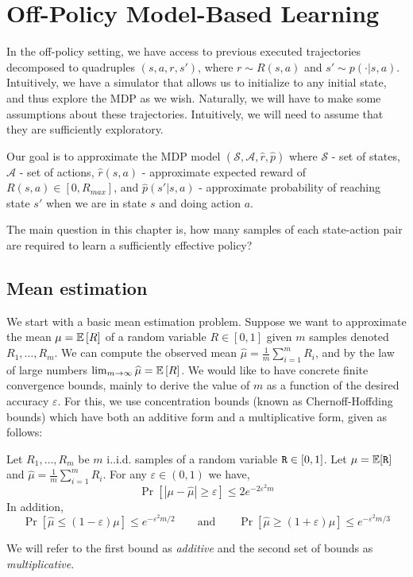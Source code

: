 \section{Off-Policy Model-Based Learning}
In the off-policy setting, we have access to previous executed trajectories decomposed to
quadruples $\left(s,a,r,s'\right)$, where $r\sim R\left(s,a\right)$
and $s'\sim p\left(\cdot|s,a\right)$. Intuitively, we have a simulator that allows us to initialize to any
initial state, and thus explore the MDP as we wish. Naturally, we will have to make some assumptions about these trajectories.
Intuitively, we will need to assume that they are sufficiently
exploratory.

Our goal is to approximate the MDP model $\left(\mathcal{S},\mathcal{A},\hat{r},\hat{p}\right)$
where $\mathcal{S}$ - set of states, $\mathcal{A}$ - set of actions,
$\hat{r}\left(s,a\right)$ - approximate expected reward of $R\left(s,a\right)\in\left[0,R_{max}\right]$,
and $\hat{p}\left(s'|s,a\right)$ - approximate probability of reaching
state $s'$ when we are in state $s$ and doing action $a$.

The main question in this chapter is, how many samples of each state-action pair are
required to learn a sufficiently effective policy?


\subsection{Mean estimation}

We start with a basic mean estimation problem. 
Suppose we want to approximate the mean $\mu=\mathbb{E}\left[R\right]$
of a random variable $R\in\left[0,1\right]$ given $m$ samples denoted
$R_{1},\dots,R_{m}$. We can compute the observed mean $\widehat{\mu}=\frac{1}{m}\sum_{i=1}^{m}R_{i}$,
and by the law of large numbers $\lim_{m\to\infty}\widehat{\mu}=\mathbb{E}\left[R\right]$.
We would like to have concrete finite convergence bounds, mainly to
derive the value of $m$ as a function of the desired accuracy $\varepsilon$.
For this, we use concentration bounds (known as Chernoff-Hoffding bounds)
which have both an additive form and a multiplicative form, given
as follows: 

\begin{lemma}
\label{lemma:chernoff}
%
Let $R_1, \ldots, R_m$ be $m$ i..i.d. samples of a random variable
${\tt R}\in[0,1]$. Let $\mu=\mathbb{E}[{\tt R}]$ and
$\widehat{\mu}=\frac{1}{m}\sum_{i=1}^m R_i$. For any
$\varepsilon\in(0,1)$ we have,
\[
\Pr[|\mu-\widehat{\mu}|\geq \varepsilon]\leq 2e^{-2\varepsilon^2 m}
\]
In addition, %
\[
\Pr[\widehat{\mu}\leq (1-\varepsilon)\mu]\leq e^{-\varepsilon^2 m
/2}\qquad \mbox{and}\qquad
 \Pr[\widehat{\mu}\geq
(1+\varepsilon)\mu]\leq e^{-\varepsilon^2 m /3}
\]
\end{lemma}
We will refer to the first bound as {\em additive} and the second
set of bounds as {\em multiplicative}.

